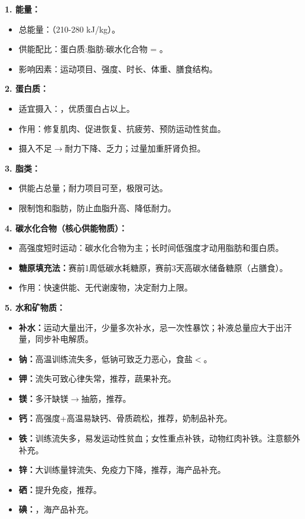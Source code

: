 \begin{defbox}
\textbf{1. 能量：}
\begin{itemize}[leftmargin=*]
    \item 总能量：（210-280 kJ/kg）。
    \item 供能配比：蛋白质:脂肪:碳水化合物 = 。
    \item 影响因素：运动项目、强度、时长、体重、膳食结构。
\end{itemize}

\textbf{2. 蛋白质：}
\begin{itemize}[leftmargin=*]
    \item 适宜摄入：，优质蛋白占以上。
    \item 作用：修复肌肉、促进恢复、抗疲劳、预防运动性贫血。
    \item 摄入不足$\rightarrow$耐力下降、乏力；过量加重肝肾负担。
\end{itemize}

\textbf{3. 脂类：}
\begin{itemize}[leftmargin=*]
    \item 供能占总量；耐力项目可至，极限可达。
    \item 限制饱和脂肪，防止血脂升高、降低耐力。
\end{itemize}

\textbf{4. 碳水化合物（核心供能物质）：}
\begin{itemize}[leftmargin=*]
    \item 高强度短时运动：碳水化合物为主；长时间低强度才动用脂肪和蛋白质。
    \item \textbf{糖原填充法：}赛前1周低碳水耗糖原，赛前3天高碳水储备糖原（占膳食）。
    \item 作用：快速供能、无代谢废物，决定耐力上限。
\end{itemize}

\textbf{5. 水和矿物质：}
\begin{itemize}[leftmargin=*]
    \item \textbf{补水：}运动大量出汗，少量多次补水，忌一次性暴饮；补液总量应大于出汗量，同步补电解质。
    \item \textbf{钠：}高温训练流失多，低钠可致乏力恶心，食盐$<$。
    \item \textbf{钾：}流失可致心律失常，推荐，蔬果补充。
    \item \textbf{镁：}多汗缺镁$\rightarrow$抽筋，推荐。
    \item \textbf{钙：}高强度+高温易缺钙、骨质疏松，推荐，奶制品补充。
    \item \textbf{铁：}训练流失多，易发运动性贫血；女性重点补铁，动物红肉补铁。注意额外补充。
    \item \textbf{锌：}大训练量锌流失、免疫力下降，推荐，海产品补充。
    \item \textbf{硒：}提升免疫，推荐。
    \item \textbf{碘：}，海产品补充。
\end{itemize}


\end{defbox}
